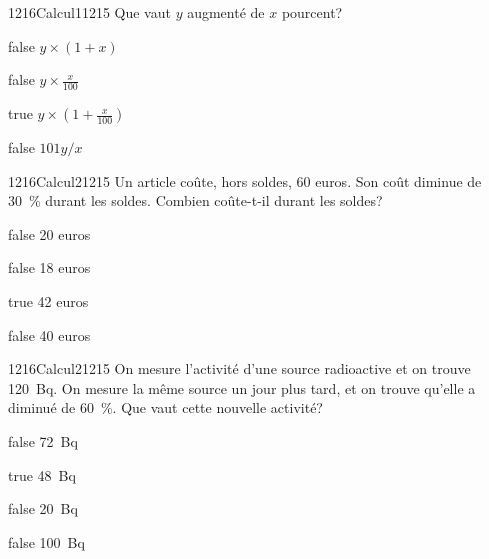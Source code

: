 \documentclass[11pt]{article}
\begin{document}
        	\begin{question}{1216}{Calcul}{1}{1215}
				Que vaut $y$ augmenté de $x$ pourcent?
            \end{question}

            \begin{reponses}
            	\item[false] $y\times (1+x)$
            	\item[false] $y\times \frac{x}{100}$
                \item[true] $y\times (1+\frac{x}{100})$
                \item[false] $101y/x$
            \end{reponses}

            \begin{question}{1216}{Calcul}{2}{1215}
                Un article coûte, hors soldes, 60 euros. Son coût diminue de \SI{30}{\percent} durant les soldes. Combien coûte-t-il durant les soldes?
            \end{question}

            \begin{reponses}
                \item[false] 20 euros
                \item[false] 18 euros
                \item[true] 42 euros
                \item[false] 40 euros
            \end{reponses}

            \begin{question}{1216}{Calcul}{2}{1215}
                On mesure l'activité d'une source radioactive et on trouve \SI{120}{\becquerel}. On mesure la même source un jour plus tard, et on trouve qu'elle a diminué de \SI{60}{\percent}. Que vaut cette nouvelle activité?
            \end{question}

            \begin{reponses}
                \item[false] \SI{72}{\becquerel}
                \item[true] \SI{48}{\becquerel}
                \item[false] \SI{20}{\becquerel}
                \item[false] \SI{100}{\becquerel}
            \end{reponses}
        
\end{document}
